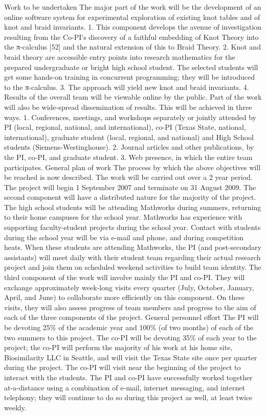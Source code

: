 \documentclass[12pt]{amsart}
\begin{document}
Work to be undertaken
The major part of the work will be the development of an online software system for experimental exploration of existing knot tables and of knot and braid invariants.
1. This component develops the avenue of investigation resulting from the Co-PI’s discovery of a faithful embedding of Knot Theory into the π-calculus [52] and the natural extension of this to Braid Theory.
2. Knot and braid theory are accessible entry points into research mathematics for the prepared undergraduate or bright high school student. The selected students will get some hands-on training in concurrent programming; they will be introduced to the π-calculus.
3. The approach will yield new knot and braid invariants.
4. Results of the overall team will be viewable online by the public.
Part of the work will also be wide-spread dissemination of results. This will be achieved in three ways.
1. Conferences, meetings, and workshops separately or jointly attended by PI (local, regional, national, and international), co-PI (Texas State, national, international), graduate student (local, regional, and national) and High School students (Siemens-Westinghouse).
2. Journal articles and other publications, by the PI, co-PI, and graduate student.
3. Web presence, in which the entire team participates.
General plan of work
The process by which the above objectives will be reached is now described.
The work will be carried out over a 2 year period. The project will begin 1 September 2007 and terminate on 31 August 2009. 
The second component will have a distributed nature for the majority of the project. The high school students will be attending Mathworks during summers, returning to their home campuses for the school year. Mathworks has experience with supporting faculty-student projects during the school year. Contact with students during the school year will be via e-mail and phone, and during competition heats. When these students are attending Mathworks, the PI (and post-secondary assistants) will meet daily with their student team regarding their actual research project and join them on scheduled weekend activities to build team identity. 
The third component of the work will involve mainly the PI and co-PI. They will exchange approximately week-long visits every quarter (July, October, January, April, and June) to collaborate more efficiently on this component. On these visits, they will also assess progress of team members and progress to the aim of each of the three components of the project. 
General personnel effort
The PI will be devoting 25\% of the academic year and 100\% (of two months) of each of the two summers to this project. The co-PI will be devoting 35\% of each year to the project; the co-PI will perform the majority of his work at his home site, Biosimilarity LLC in Seattle, and will visit the Texas State site once per quarter during the project. The co-PI will visit near the beginning of the project to interact with the students. The PI and co-PI have successfully worked together at-a-distance using a combination of e-mail, internet messaging, and internet telephony; they will continue to do so during this project as well, at least twice weekly.
\end{document}
